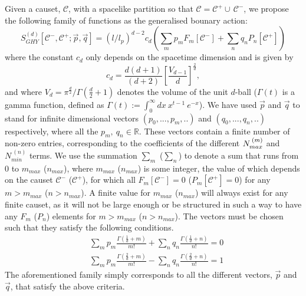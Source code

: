 \documentclass[12pt]{article}
\newcommand{\be}{\begin{equation}}
\newcommand{\ee}{\end{equation}}
\newcommand{\F}[1]{F_{#1}}
\renewcommand{\P}[1]{P_{#1}}
\begin{document}
Given a causet, $\mathcal{C}$, with a spacelike partition so that $\mathcal C = \mathcal C^+ \cup\, \mathcal C^-$, we propose the following family of functions as the generalised bounary action:
\be\label{general_boundary_sum}
S^{ (d)}_{GHY}\left[\mathcal{C}^-,\mathcal{C}^+;\vec{p}, \vec{q} \right]= \left (l/l_p\right)^{d-2} c_{d}
\left ( \sum_m p_m \F{m}\left[\mathcal{C}^- \right]
+  \sum_n q_n \P{n}\left[\mathcal{C}^+ \right]\right)
\ee
where the constant $c_{d}$ only depends on the spacetime dimension and is given by
\be\label{Cn}
c_{d}=\frac{d (d+1)}{ (d+2)}\left[\frac{V_{d-1}}{d}\right]^{\frac{2}{d}},
\ee
and where $V_d=\pi^{\frac{d}{2}}/\Gamma\left (\frac{d}{2}+1\right)$ denotes the volume of the unit $d$-ball ($\Gamma (t)$ is a gamma function, defined as $\Gamma (t):=\int_0^\infty dx\: x^{t-1}\: e^{-x}$). We have used $\vec{p}$ and $\vec{q}$ to stand for infinite dimensional vectors $ (p_0,...,p_m,..)$ and $ (q_0,...,q_n,..)$ respectively, where all the $p_m,\: q_n \in \mathbb{R}$. These vectors contain a finite number of non-zero entries, corresponding to the coefficients of the different $N_{{max\vphantom{i}}}^{\: (m)}$ and $N_{{min}}^{\: (n)}$ terms. We use the summation $\sum_m$ ($\sum_n$) to denote a sum that runs from $0$ to $m_{max}$ ($n_{max}$), where $m_{max}$ ($n_{max}$) is some integer, the value of which depends on the causet $\mathcal{C}^-$ ($\mathcal{C}^+$), for which all $\F{m}\left[\mathcal{C}^- \right]=0$ ($\P{m}\left[\mathcal{C}^+ \right]=0$) for any $m>m_{max}$ ($n>n_{max}$). A finite value for $m_{max}$ ($n_{max}$) will always exist for any finite causet, as it will not be large enough or be structured in such a way to have any $\F{m}$ ($\P{n}$) elements for $m>m_{max}$ ($n>n_{max}$). The vectors must be chosen such that they satisfy the following conditions.
\begin{align}\label{coefficient_relation1}
& \sum_m p_m \frac{\Gamma\left (\frac{1}{d}+m \right)}{m!}  + \sum_n q_n\frac{\Gamma\left (\frac{1}{d}+n \right)}{n!}=0
\\
& \label{coefficient_relation2}\sum_m p_m \frac{\Gamma\left (\frac{2}{d}+m \right)}{m!}  - \sum_n q_n\frac{\Gamma\left (\frac{2}{d}+n \right)}{n!}=1
\end{align}
The aforementioned family simply corresponds to all the different vectors, $\vec{p}$ and $\vec{q}$, that satisfy the above criteria.
\end{document}
